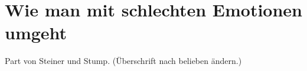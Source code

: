 \section*{Wie man mit schlechten Emotionen umgeht}

Part von Steiner und Stump. (Überschrift nach belieben ändern.)